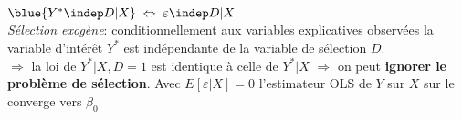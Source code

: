 \bigbreak
\begin{boxH}
    \underline{\textbf{}} \; $\blue{ Y^{*} \indep D\vert X} \; \Leftrightarrow \; \varepsilon \indep D\vert X$\\
    \textit{Sélection exogène}: conditionnellement aux variables explicatives observées la variable d'intérêt $Y^{*}$ est indépendante de la variable de sélection $D$.\\
    $\boldsymbol{\Longrightarrow }$ la loi de $Y^{*} \vert X, D=1$ est identique à celle de $Y^{*} \vert X$ $\Rightarrow$ on peut \textbf{ignorer le problème de sélection}. Avec $E[\varepsilon\vert X]=0$ l'estimateur OLS de $Y$ sur $X$ sur le  converge vers $\beta_{0}$
\end{boxH}


